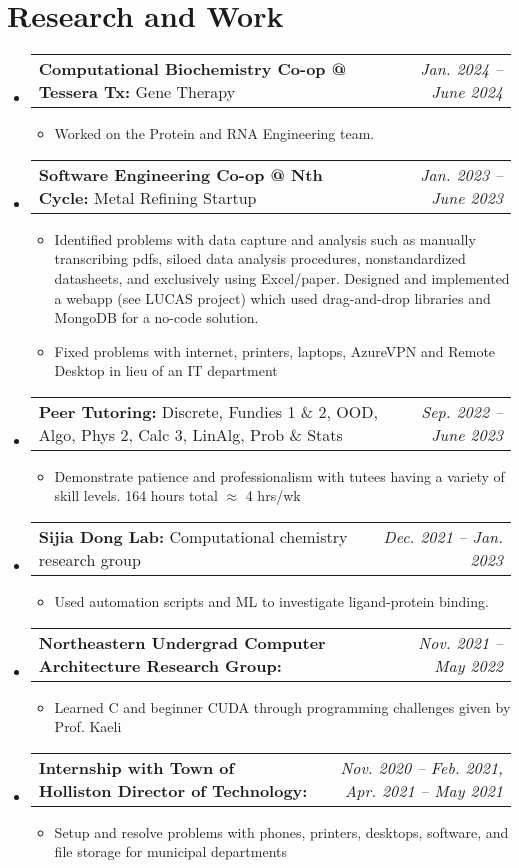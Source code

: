 \documentclass[letterpaper,11pt]{article}
\makeatletter
\newcommand{\resumeBullet}[1]{
  \item\small{
    #1 \vspace{-2pt}
  }
}
\newcommand{\resumeSubheadingThin}[3]{
  \vspace{-1pt}\item
    \begin{tabular*}{0.97\textwidth}[t]{l@{\extracolsep{\fill}}r}
      \small\textbf{#1:} #3 & \small\textit{#2} 
    \end{tabular*}\vspace{-7pt}
}
\newcommand{\resumeSubHeadingListStart}{\begin{itemize}[leftmargin=*]}
\newcommand{\resumeSubHeadingListEnd}{\end{itemize}}
\newcommand{\resumeItemListStart}{\begin{itemize}}
\newcommand{\resumeItemListEnd}{\end{itemize}\vspace{-5pt}}
\makeatother
\begin{document}
  \section{Research and Work}
  \resumeSubHeadingListStart
  \resumeSubheadingThin{Computational Biochemistry Co-op @ Tessera Tx}{Jan. 2024 -- June 2024}{Gene Therapy}
  \resumeItemListStart
  \resumeBullet{Worked on the Protein and RNA Engineering team.}
  \resumeItemListEnd
  \resumeSubheadingThin{Software Engineering Co-op @ Nth Cycle}{Jan. 2023 -- June 2023}{Metal Refining Startup}
  \resumeItemListStart
  \resumeBullet{Identified problems with data capture and analysis such as manually transcribing pdfs, siloed data analysis procedures, nonstandardized datasheets, and exclusively using Excel/paper. Designed and implemented a webapp (see LUCAS project) which used drag-and-drop libraries and MongoDB for a no-code solution. }
  \resumeBullet{Fixed problems with internet, printers, laptops, AzureVPN and Remote Desktop in lieu of an IT department}
  \resumeItemListEnd
  \resumeSubheadingThin{Peer Tutoring}{Sep. 2022 -- June 2023}{Discrete, Fundies 1 \& 2, OOD, Algo, Phys 2, Calc 3, LinAlg, Prob \& Stats}
  \resumeItemListStart
    \resumeBullet{Demonstrate patience and professionalism with tutees having a variety of skill levels. 164 hours total $\approx$ 4 hrs/wk}
  \resumeItemListEnd
  \resumeSubheadingThin{Sijia Dong Lab}{Dec. 2021 -- Jan. 2023}{Computational
  chemistry research group} \resumeItemListStart \resumeBullet{Used automation scripts and ML to investigate ligand-protein binding.}
\resumeItemListEnd
  \resumeSubheadingThin{Northeastern Undergrad Computer Architecture Research Group}{Nov. 2021 -- May 2022}{} \resumeItemListStart \resumeBullet{Learned C and beginner CUDA through programming challenges given by Prof. Kaeli}
  \resumeItemListEnd
  \resumeSubheadingThin{Internship with Town of Holliston Director of Technology}{Nov. 2020 -- Feb. 2021, Apr. 2021 -- May 2021}{}
  \resumeItemListStart
    \resumeBullet{Setup and resolve problems with phones, printers, desktops, software, and file storage for municipal departments}
  \resumeItemListEnd \resumeSubHeadingListEnd
\end{document}
